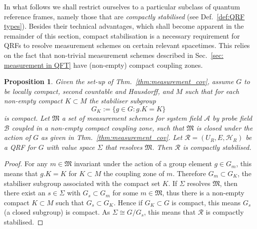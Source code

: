 \documentclass[sn-mathphys-num]{sn-jnl}%
\newcommand{\HH}{\mathcal{H}}
\newcommand{\Af}{\mathscr{A}}
\newcommand{\Bf}{\mathscr{B}}
\numberwithin{equation}{section}
\theoremstyle{thmstyleone}%
\newtheorem{proposition}[theorem]{Proposition}%
\theoremstyle{thmstyletwo}%
\theoremstyle{thmstylethree}%
\begin{document}
In what follows we shall restrict ourselves to a particular subclass of quantum reference frames, namely those that are \textit{compactly stabilised} (see Def.\ \ref{def:QRF types}). Besides their technical advantages, which shall become apparent in the remainder of this section, compact stabilisation is a necessary requirement for QRFs to resolve measurement schemes on certain relevant spacetimes. This relies on the fact that non-trivial measurement schemes described in Sec.~\ref{sec: measurement in QFT} have (non-empty) compact coupling zones.
\begin{proposition}
    \label{prop:compact_stab}Given the set-up of Thm.~\ref{thm:measurement_cov}, assume $G$ to be locally compact, second countable and Hausdorff, and $M$ such that for each non-empty compact $K\subset M$ the stabiliser subgroup 
    \begin{equation}
        G_K:=\{g\in G:g.K=K\}
    \end{equation}
    is compact. Let $\mathfrak{M}$ a set of measurement schemes for system field $\Af$ by probe field $\Bf$ coupled in a non-empty compact coupling zone, such that $\mathfrak{M}$ is closed under the action of $G$ as given in Thm.~\ref{thm:measurement_cov}. Let $\mathcal{R}=(U_R,E,\HH_R)$ be a QRF for $G$ with value space $\Sigma$ that resolves $\mathfrak{M}$. Then $\mathcal{R}$ is compactly stabilised.
\end{proposition}
\begin{proof}
For any $m\in\mathfrak{M}$ invariant under the action of a group element $g\in G_m$, this means that $g.K=K$ for $K\subset M$ the coupling zone of $m$. Therefore $G_m\subset G_K$, the stabiliser subgroup associated with the compact set $K$. If $\Sigma$ resolves $\mathfrak{M}$, then there exist an $s\in \Sigma$ with $G_s\subset G_m$ for some $m\in\mathfrak{M}$, thus there is a non-empty compact $K\subset M$ such that $G_s\subset G_K$. Hence if $G_K\subset G$ is compact, this means $G_s$ (a closed subgroup) is compact. As $\Sigma\cong G/G_s$, 
this means that $\mathcal{R}$ is compactly stabilised.
\end{proof}
\end{document}
